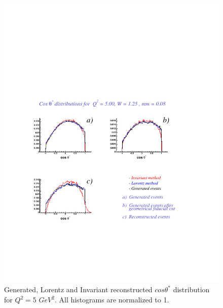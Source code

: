 \begin{figure}[h]
    \begin{center}
        \includegraphics[width = 12cm, bb = 60 140 540 540]{appendix/img/ctheta_q25.00_W1.25_mm0.08}
        \caption{Generated, Lorentz and Invariant reconstructed $cos\theta^*$ distribution for $Q^2=5$ $GeV^2$.
        All histograms are normalized to 1.}
    \end{center}
\end{figure}
